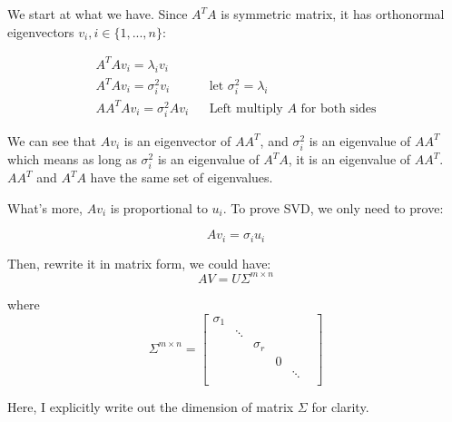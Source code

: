 \documentclass[a4paper]{book}
\newenvironment{proof}[1][Proof]{\begin{trivlist}
\item[\hskip \labelsep {\bfseries #1}]}{\end{trivlist}}
\begin{document}
      \begin{proof}
        We start at what we have. Since $A^{T}A$ is symmetric matrix, it
        has orthonormal eigenvectors $v_{i}, i \in \{1, ..., n\}$:

        \begin{align*}
          A^{T}Av_{i} = \lambda_{i}v_{i}    
            && \\
          A^{T}Av_{i} = \sigma_{i}^{2}v_{i} 
            && \text{let }\sigma_{i}^{2} = \lambda_{i}\\
          AA^{T}Av_{i} = \sigma_{i}^{2}Av_{i} 
            && \text{Left multiply $A$ for both sides}
        \end{align*}

        We can see that $Av_{i}$ is an eigenvector of $AA^{T}$, and
        $\sigma_{i}^{2}$ is an eigenvalue of $AA^{T}$ which means as long as
        $\sigma_{i}^{2}$ is an eigenvalue of $A^{T}A$, it is an eigenvalue
        of $AA^{T}$. $AA^{T}$ and $A^{T}A$ have the same set of
        eigenvalues.

        What's more, $Av_{i}$ is proportional to $u_{i}$.  To prove SVD,
        we only need to prove:

        \begin{equation}
          Av_{i} = \sigma_{i}u_{i}
          \label{eq:svd_prove_prove_target}
        \end{equation}

        Then, rewrite it in matrix form, we could have:
        \begin{displaymath}
          AV = U\Sigma^{m \times n}
        \end{displaymath}

        where
        \begin{displaymath}
          \Sigma^{m \times n}
          = 
          \begin{bmatrix}
            \sigma_{1}  &         & \\
                        & \ddots  & \\
                        &         & \sigma_{r} &    \\
                        &         &            & 0  &\\
                        &         &            &    & \ddots  & \\
          \end{bmatrix}
        \end{displaymath}

        Here, I explicitly write out the dimension of matrix $\Sigma$
        for clarity.


\end{proof}
\end{document}
